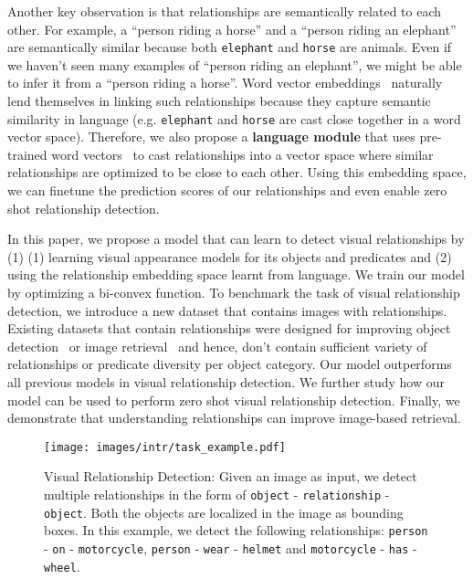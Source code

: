 \documentclass[runningheads]{llncs}
\newcommand{\relationship}[3]{\texttt{#1} - \texttt{#2} - \texttt{#3}}
\newcommand{\eg}[1]{e.g. #1}
\begin{document}
Another key observation is that relationships are semantically related to each other. For example, a ``person riding a horse'' and  a ``person riding an elephant'' are semantically similar because both \texttt{elephant} and \texttt{horse} are animals. Even if we haven't seen many examples of ``person riding an elephant'', we might be able to infer it from a ``person riding a horse''. Word vector embeddings~\cite{mikolov2013efficient} naturally lend themselves in linking such relationships because they capture semantic similarity in language (\eg \texttt{elephant} and \texttt{horse} are cast close together in a word vector space). Therefore, we also propose a \textbf{language module} that uses pre-trained word vectors~\cite{mikolov2013efficient} to cast relationships into a vector space where similar relationships are optimized to be close to each other. Using this embedding space, we can finetune the prediction scores of our relationships and even enable zero shot relationship detection.

In this paper, we propose a model that can learn to detect visual relationships by (1) (1) learning visual appearance models for its objects and predicates and  (2) using the relationship embedding space learnt from language. We train our model by optimizing a bi-convex function. To benchmark the task of visual relationship detection, we introduce a new dataset that contains  images with  relationships. Existing datasets that contain relationships were designed for improving object detection~\cite{sadeghi2011recognition} or image retrieval~\cite{Johnson2015Image} and hence, don't contain sufficient variety of relationships or predicate diversity per object category. Our model outperforms all previous models in visual relationship detection. We further study how our model can be used to perform zero shot visual relationship detection. Finally, we demonstrate that understanding relationships can improve image-based retrieval.

\begin{figure*}[t]
\centering
\setlength{\belowcaptionskip}{-20pt}
\texttt{[image: images/intr/task\_example.pdf]}
\caption{Visual Relationship Detection: Given an image as input, we detect multiple relationships in the form of \relationship{object}{relationship}{object}. Both the objects are localized in the image as bounding boxes. In this example, we detect the following relationships: \relationship{person}{on}{motorcycle}, \relationship{person}{wear}{helmet} and \relationship{motorcycle}{has}{wheel}.}
\label{fig:task}
\end{figure*}
\end{document}
